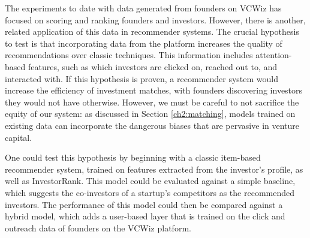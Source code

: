 The experiments to date with data generated from founders on VCWiz has focused on scoring and ranking founders and investors. However, there is another, related application of this data in recommender systems. The crucial hypothesis to test is that incorporating data from the platform increases the quality of recommendations over classic techniques. This information includes attention-based features, such as which investors are clicked on, reached out to, and interacted with. If this hypothesis is proven, a recommender system would increase the efficiency of investment matches, with founders discovering investors they would not have otherwise. However, we must be careful to not sacrifice the equity of our system: as discussed in Section \ref{ch2:matching}, models trained on existing data can incorporate the dangerous biases that are pervasive in venture capital.

One could test this hypothesis by beginning with a classic item-based recommender system, trained on features extracted from the investor's profile, as well as InvestorRank. This model could be evaluated against a simple baseline, which suggests the co-investors of a startup's competitors as the recommended investors. The performance of this model could then be compared against a hybrid model, which adds a user-based layer that is trained on the click and outreach data of founders on the VCWiz platform.
